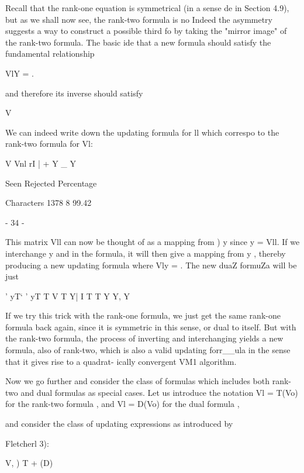      Recall that the rank-one equation is symmetrical (in a sense de
in Section 4.9), but as we shall now see, the rank-two formula is no
Indeed the asymmetry suggests a way to construct a possible third fo
by taking the "mirror image" of the rank-two formula.  The basic ide
that a new formula should satisfy the fundamental relationship
 
                           VlY =  .
 
 
and therefore its inverse should satisfy
 
                                 V 
 
 
We can indeed write down the updating formula for ll which correspo
to the rank-two formula for Vl:
 
 
 
                 V           Vnl rI |  + Y _ Y
 
                 Seen Rejected  Percentage
 
Characters       1378        8   99.42
 
                                 - 34 -
 
 
This matrix Vll can now be thought of as a mapping from  ) y since
y = Vll.  If we interchange y and  in the formula, it will then give
a mapping from y  , thereby producing a new updating formula where
Vly = .  The new duaZ formuZa will be just
 
 
                        '    yT`   '   yT   T
                     V          T  Y| I    T      T
                           Y   Y,  Y
 
 
If we try this trick with the rank-one formula, we just get the same
rank-one formula back again, since it is symmetric in this sense, or
dual to itself.  But with the rank-two formula, the process of inverting
and interchanging yields a new formula, also of rank-two, which is also
a valid updating forr__ula in the sense that it gives rise to a quadrat-
ically convergent VM1 algorithm.
 
     Now we go further and consider the class of formulas which includes
both rank-two and dual formulas as special cases.  Let us introduce the
notation
                   Vl = T(Vo)   for the rank-two formula ,
and
                   Vl = D(Vo)   for the dual formula ,
 
 
and consider the class of updating expressions as introduced by
 
Fletcherl 3):
 
                         V,        ) T +  (D)
 
